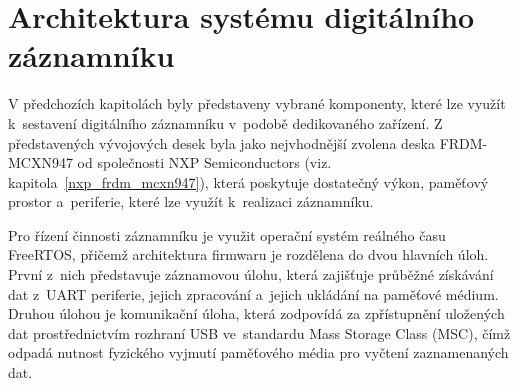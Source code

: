 

\section{Architektura systému digitálního záznamníku}
\label{architektura_systemu_digitalniho_zaznamniku}
V předchozích kapitolách byly představeny vybrané komponenty, které lze využít k~sestavení digitálního záznamníku v~podobě dedikovaného zařízení. Z představených vývojových desek byla jako nejvhodnější zvolena deska FRDM-MCXN947 od společnosti NXP Semiconductors (viz. kapitola~\ref{nxp_frdm_mcxn947}), která poskytuje dostatečný výkon, paměťový prostor a~periferie, které lze využít k~realizaci záznamníku.

Pro řízení činnosti záznamníku je využit operační systém reálného času FreeRTOS, přičemž architektura firmwaru je rozdělena do dvou hlavních úloh. První z~nich představuje záznamovou úlohu, která zajišťuje průběžné získávání dat z~UART periferie, jejich zpracování a~jejich ukládání na paměťové médium. Druhou úlohou je komunikační úloha, která zodpovídá za zpřístupnění uložených dat prostřednictvím rozhraní USB ve~standardu Mass Storage Class (MSC), čímž odpadá nutnost fyzického vyjmutí paměťového média pro vyčtení zaznamenaných dat. 



